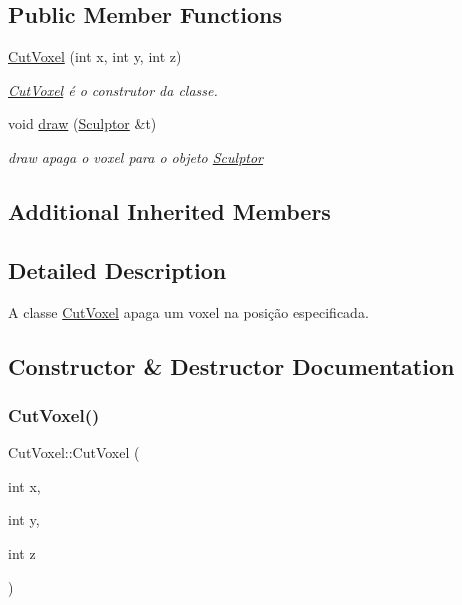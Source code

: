 \subsection*{Public Member Functions}
\begin{DoxyCompactItemize}
\item 
\hyperlink{class_cut_voxel_a32d12f653ebb96da8c3aa62994692bad}{Cut\+Voxel} (int x, int y, int z)
\begin{DoxyCompactList}\small\item\em \hyperlink{class_cut_voxel}{Cut\+Voxel} é o construtor da classe. \end{DoxyCompactList}\item 
void \hyperlink{class_cut_voxel_a4619616e021723dccaf5c7cf12164e01}{draw} (\hyperlink{class_sculptor}{Sculptor} \&t)
\begin{DoxyCompactList}\small\item\em draw apaga o voxel para o objeto \hyperlink{class_sculptor}{Sculptor} \end{DoxyCompactList}\end{DoxyCompactItemize}
\subsection*{Additional Inherited Members}


\subsection{Detailed Description}
A classe \hyperlink{class_cut_voxel}{Cut\+Voxel} apaga um voxel na posição especificada. 

\subsection{Constructor \& Destructor Documentation}
\mbox{\label{class_cut_voxel_a32d12f653ebb96da8c3aa62994692bad}} 
\subsubsection{\texorpdfstring{Cut\+Voxel()}{CutVoxel()}}
{\footnotesize\ttfamily Cut\+Voxel\+::\+Cut\+Voxel (\begin{DoxyParamCaption}\item[{int}]{x,  }\item[{int}]{y,  }\item[{int}]{z }\end{DoxyParamCaption})}



